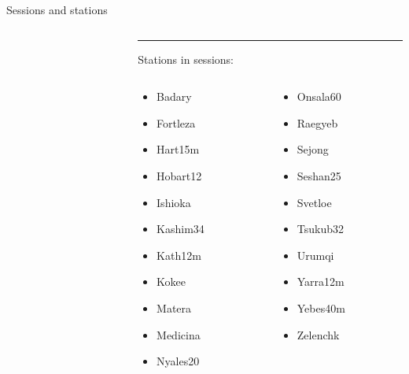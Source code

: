 \documentclass{beamer}
\begin{document}
\begin{frame}{Sessions and stations}
\begin{columns}[T]
\begin{column}{.48\textwidth}
            \end{column}
            \hfill
            \begin{column}{.5\textwidth}
                \rule{\linewidth}{4pt}
                Stations in sessions:
                \begin{columns}[T] %
                    \begin{column}{.5\textwidth}
                        \begin{itemize}
                            \item Badary
                            \item Fortleza
                            \item Hart15m
                            \item Hobart12
                            \item Ishioka
                            \item Kashim34
                            \item Kath12m
                            \item Kokee
                            \item Matera
                            \item Medicina
                            \item Nyales20
                       \end{itemize}
                    \end{column}
                    \begin{column}{.5\textwidth}
                        \begin{itemize}
                            \item Onsala60
                            \item Raegyeb
                            \item Sejong
                            \item Seshan25
                            \item Svetloe
                            \item Tsukub32
                            \item Urumqi
                            \item Yarra12m
                            \item Yebes40m
                            \item Zelenchk
                       \end{itemize}
                    \end{column}
                \end{columns}
            \end{column}%
        \end{columns}
    \end{frame}
\end{document}
